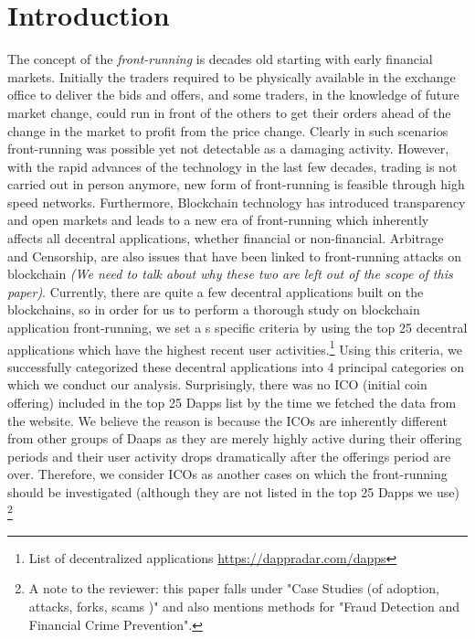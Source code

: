 \section{Introduction}

\label{sec:intro}


The concept of the \emph{front-running} is decades old starting with early financial markets. Initially the traders required to be physically available in the exchange office to deliver the bids and offers, and some traders, in the knowledge of future market change, could run in front of the others to get their orders ahead of the change in the market to profit from the price change. Clearly in such scenarios front-running was possible yet not detectable as a damaging activity. However, with the rapid advances of the technology in the last few decades, trading is not carried out in person anymore, new form of front-running is feasible through high speed networks. Furthermore, Blockchain technology has introduced transparency and open markets and leads to a new era of front-running which inherently affects all decentral applications, whether financial or non-financial. Arbitrage and Censorship, are also issues that have been linked to front-running attacks on blockchain \textit{(We need to talk about why these two are left out of the scope of this paper)}. Currently, there are quite a few decentral applications built on the blockchains, so in order for us to perform a thorough study on blockchain application front-running, we set a s specific criteria by using the top 25 decentral applications which have the highest recent user activities.\footnote{List of decentralized applications \url{https://dappradar.com/dapps}} Using this criteria, we successfully categorized these decentral applications into 4 principal categories on which we conduct our analysis. Surprisingly, there was no ICO (initial coin offering) included in the top 25 Dapps list by the time we fetched the data from the website. We believe the reason is because the ICOs are inherently different from other groups of Daaps as they are merely highly active during their offering periods and their user activity drops dramatically after the offerings period are over. Therefore, we  consider ICOs as another cases on which the front-running should be investigated (although they are not listed in the top 25 Dapps we use) \footnote{A note to the reviewer: this paper falls under "Case Studies (\eg of adoption, attacks, forks, scams \etc)" and also mentions methods for "Fraud Detection and Financial Crime Prevention".}


